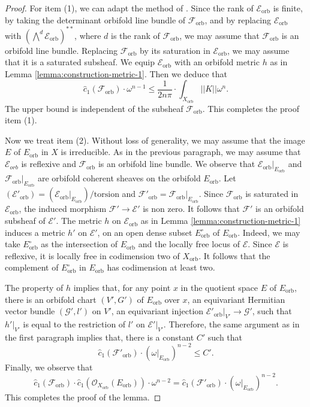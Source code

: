 \documentclass[12pt]{amsart}
\newcommand{\<}{\leq}
\def\mcO{\mathcal{O}}
\def\mcE{\mathcal{E}}
\def\mcF{\mathcal{F}}
\def\mcG{\mathcal{G}}
\theoremstyle{remark}
\theoremstyle{definition}
\theoremstyle{definition}
\numberwithin{equation}{section}
\theoremstyle{definition}
\theoremstyle{definition}
\def\orb{\mathrm{orb}}
\begin{document}
\begin{proof}
For item (1),  we can adapt the method of \cite[Lemma V.7.16]{Kob14}.  
Since the rank of $\mcE_{\orb}$ is finite, by taking the determinant orbifold line bundle of $\mcF_{\orb}$, and by replacing $\mcE_{\orb}$ with $(\bigwedge^d\mcE_{\orb})^{**}$, where $d$ is the rank of $\mcF_{\orb}$,  we may assume that $\mcF_{\orb}$ is an orbifold line bundle.  
Replacing $\mcF_{\orb}$ by its saturation in $\mcE_{\orb}$, we may assume that it is a  saturated subsheaf. 
We equip $\mcE_{\orb}$ with an orbifold metric $h$ as in Lemma \ref{lemma:construction-metric-1}.  
Then we deduce that 
\[ \hat{c}_1 (\mcF_{\orb})  \cdot \omega^{n-1} \<  \frac{1}{2n \pi} \cdot \int_{X_{\orb}} ||K|| \omega^n. \]
The upper bound is independent of the subsheaf $\mcF_{\orb}$. 
This completes the proof item (1). 

Now we treat item (2). 
Without loss of generality, we may assume that the image $E$ of $E_{\orb}$ in $X$ is irreducible.  
As in the previous paragraph, we may assume that $\mcE_{orb}$ is reflexive and  $\mcF_{\orb}$ is an orbifold line bundle.  
We  observe that $\mcE_{\orb}|_{E_{\orb}}$  and $\mcF_{\orb}|_{E_{\orb}}$ are orbifold coherent sheaves on the orbifold $E_{\orb}$. 
Let  $(\mcE'_{\orb}) = (\mcE_{\orb}|_{E_{\orb}})/\mathrm{torsion} $ and $\mcF'_{\orb} = \mcF_{\orb}|_{E_{\orb}}$. 
Since $\mcF_{\orb}$ is saturated in $\mcE_{\orb}$, the induced morphism $\mcF' \to \mcE'$ is non zero. 
It follows that $\mcF'$ is an orbifold subsheaf of $\mcE'$. 
The metric $h$ on $\mcE_{\orb}$ as in Lemma \ref{lemma:construction-metric-1} induces a metric $h'$ on $\mcE'$, on an open dense subset $E_{\orb}^\circ$ of $E_{\orb}$. 
Indeed, we may take $E_{\orb}^\circ$ as the intersection of $E_{\orb}$ and the locally free locus of $\mcE$. 
Since $\mcE$ is reflexive, it is locally free in codimension two of $X_{\orb}$. 
It follows that the complement of $E_{\orb}^\circ$ in $E_{\orb}$ has codimension at least two. 

The property  of $h$ implies that, for any point  $x$ in the quotient space $E$ of $E_{\orb}$, there is an orbifold chart $(V',G')$ of $E_{\orb}$ over $x$, an equivariant Hermitian vector bundle $(\mcG',l')$ on $V'$,  an equivariant injection $\mcE'_{\orb}|_{V'} \to \mcG'$, such that $h'|_{V'}$   is equal to  the restriction of $l'$ on $\mcE'|_{V'}$.  
Therefore, the same argument as in the first paragraph implies that, there is a constant $C'$ such that 
\[
\hat{c}_1( \mcF'_{\orb} ) \cdot (\omega|_{E_{\orb}})^{n-2} \< C'.
\]
Finally, we  observe that 
\[
\hat{c}_1( \mcF_{\orb} ) \cdot \hat{c}_1( \mcO_{X_{\orb}}(E_{\orb}) ) \cdot \omega^{n-2} 
=  \hat{c}_1( \mcF'_{\orb} ) \cdot (\omega|_{E_{\orb}})^{n-2}.
\]
This completes the proof of the lemma. 
\end{proof}
\end{document}
